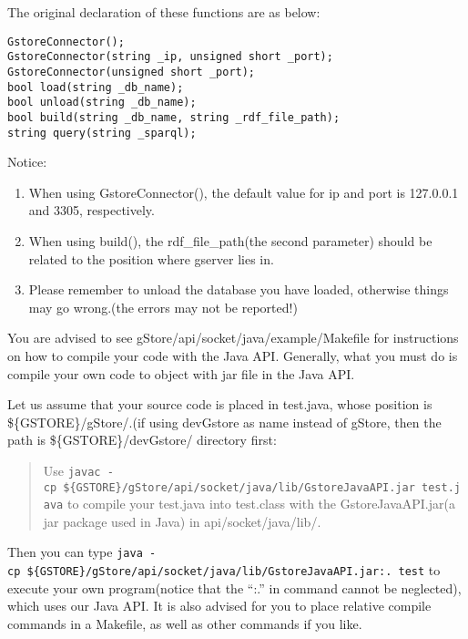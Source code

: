 \documentclass[titlepage, a4paper, 12pt]{article}
\begin{document}
The original declaration of these functions are as below:

\begin{verbatim}
GstoreConnector();
GstoreConnector(string _ip, unsigned short _port);
GstoreConnector(unsigned short _port);
bool load(string _db_name);
bool unload(string _db_name);
bool build(string _db_name, string _rdf_file_path);
string query(string _sparql);
\end{verbatim}

Notice:

\begin{enumerate}
\item
  When using GstoreConnector(), the default value for ip and port is
  127.0.0.1 and 3305, respectively.
\item
  When using build(), the rdf\_file\_path(the second parameter) should
  be related to the position where gserver lies in.
\item
  Please remember to unload the database you have loaded, otherwise
  things may go wrong.(the errors may not be reported!)
\end{enumerate}


You are advised to see gStore/api/socket/java/example/Makefile for instructions on how to compile your code with the Java API. Generally, what you must do is compile your own code to object with jar file in the Java API.

Let us assume that your source code is placed in test.java, whose position is \$\{GSTORE\}/gStore/.(if using devGstore as name instead of gStore, then the path is \$\{GSTORE\}/devGstore/ directory first:

\begin{quote}
Use \texttt{javac\ -cp\ \$\{GSTORE\}/gStore/api/socket/java/lib/GstoreJavaAPI.jar\ test.java} to compile your test.java into test.class with the GstoreJavaAPI.jar(a jar package used in Java) in api/socket/java/lib/.
\end{quote}

Then you can type \texttt{java\ -cp\ \$\{GSTORE\}/gStore/api/socket/java/lib/GstoreJavaAPI.jar:.\ test} to execute your own program(notice that the ``:.'' in command cannot be neglected), which uses our Java API. It is also advised for you to place relative compile commands in a Makefile, as well as other commands if you like.
\end{document}
